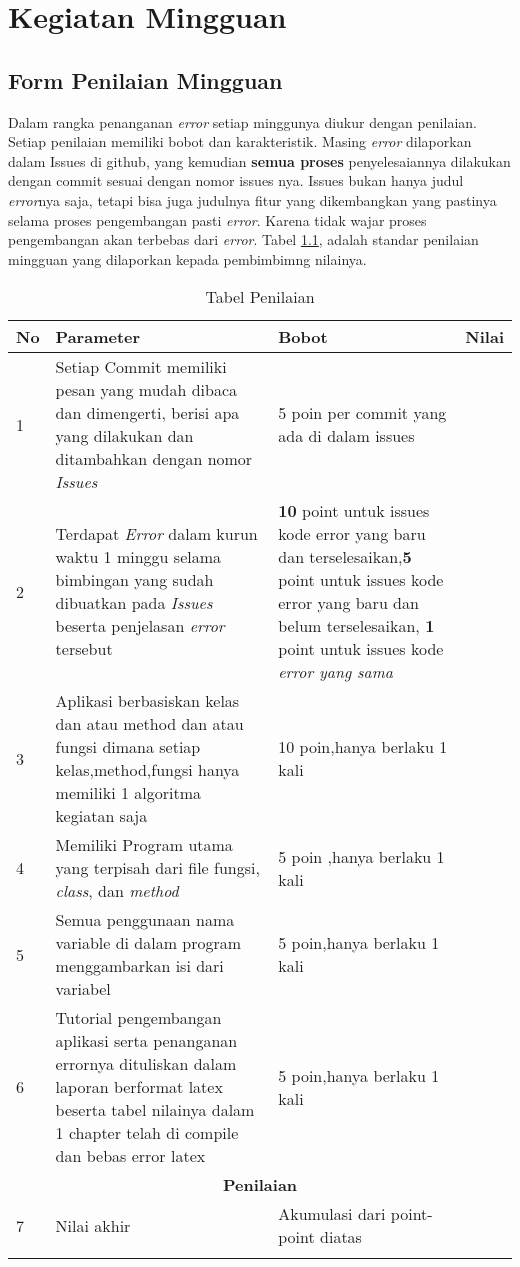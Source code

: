 \chapter{Kegiatan Mingguan}

\section{Form Penilaian Mingguan}
\par
Dalam rangka penanganan \textit{error} setiap minggunya diukur dengan penilaian. Setiap penilaian memiliki bobot dan karakteristik. 
Masing \textit{error} dilaporkan dalam Issues di github, yang kemudian \textbf{semua proses} penyelesaiannya dilakukan dengan commit sesuai dengan nomor issues nya.
Issues bukan hanya judul \textit{error}nya saja, tetapi bisa juga judulnya fitur yang dikembangkan yang pastinya selama proses pengembangan pasti \textit{error}.
Karena tidak wajar proses pengembangan akan terbebas dari \textit{error}. Tabel \ref{table:penilaian}, adalah standar penilaian mingguan yang dilaporkan kepada pembimbimng nilainya.

 \begin{longtable}{|p{}|p{}|p{}|p{}|}
\hline
No&Parameter&Bobot&Nilai\\
\hline
1 &Setiap Commit memiliki pesan yang mudah dibaca dan dimengerti, berisi apa yang dilakukan dan ditambahkan dengan nomor \textit{Issues}&5 poin per commit yang ada di dalam issues& \\ \hline
2 &Terdapat \textit{Error} dalam kurun waktu 1 minggu selama bimbingan yang sudah dibuatkan pada \textit{Issues} beserta penjelasan \textit{error} tersebut&\textbf{10} point untuk issues kode error yang baru dan terselesaikan,\textbf{5} point untuk issues kode error yang baru dan belum terselesaikan, \textbf{1} point untuk issues kode \textit{error yang sama}& \\ \hline
3 &Aplikasi berbasiskan kelas dan atau method dan atau fungsi dimana setiap kelas,method,fungsi hanya memiliki 1 algoritma kegiatan saja&10 poin,hanya berlaku 1 kali & \\ \hline
4 &Memiliki Program utama yang terpisah dari file fungsi, \textit{class}, dan \textit{method}&5 poin ,hanya berlaku 1 kali & \\ \hline
5 &Semua penggunaan nama variable di dalam program menggambarkan isi dari variabel& 5 poin,hanya berlaku 1 kali& \\ \hline
6 &Tutorial pengembangan aplikasi serta penanganan errornya dituliskan dalam laporan berformat latex beserta tabel nilainya dalam 1 chapter telah di compile dan bebas error latex & 5 poin,hanya berlaku 1 kali& \\ \hline
\multicolumn{4}{c}{\textbf{Penilaian}}\\ \hline

7 &Nilai akhir&Akumulasi dari point-point diatas & \\ \hline

\caption{Tabel Penilaian}
\label{table:penilaian}
\end{longtable}

